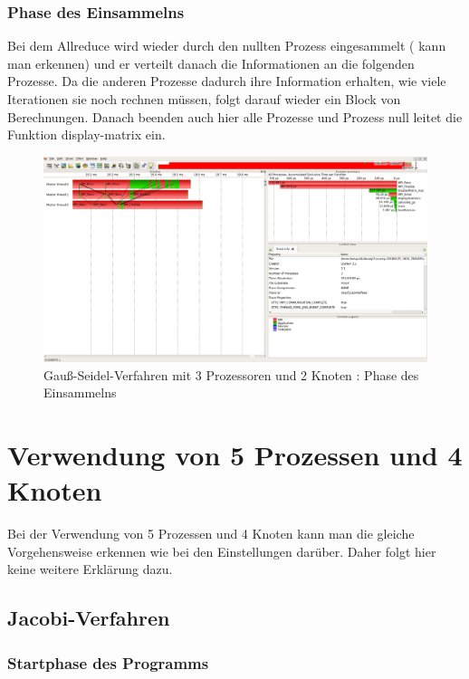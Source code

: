 \documentclass[11pt,a4paper]{article}
\begin{document}
\subsubsection{Phase des Einsammelns}
Bei dem Allreduce wird wieder durch den nullten Prozess eingesammelt ( kann man erkennen) und er verteilt danach die Informationen an die folgenden Prozesse. Da die anderen Prozesse dadurch ihre Information erhalten, wie viele Iterationen sie noch rechnen müssen, folgt darauf wieder ein Block von Berechnungen. Danach beenden auch hier alle Prozesse und Prozess null leitet die Funktion display-matrix ein.
\begin{figure}[htbp] %
   \centering
   \includegraphics[width=1\textwidth]{Seidel_3.png} 
   \caption{Gauß-Seidel-Verfahren mit 3 Prozessoren und 2 Knoten : Phase des Einsammelns}
   \label{Seidel_3}
\end{figure}




\section{Verwendung von 5 Prozessen und 4 Knoten}

Bei der Verwendung von 5 Prozessen und 4 Knoten kann man die gleiche Vorgehensweise erkennen wie bei den Einstellungen darüber. Daher folgt hier keine weitere Erklärung dazu.

\subsection{Jacobi-Verfahren}


\subsubsection{Startphase des Programms}
\end{document}
